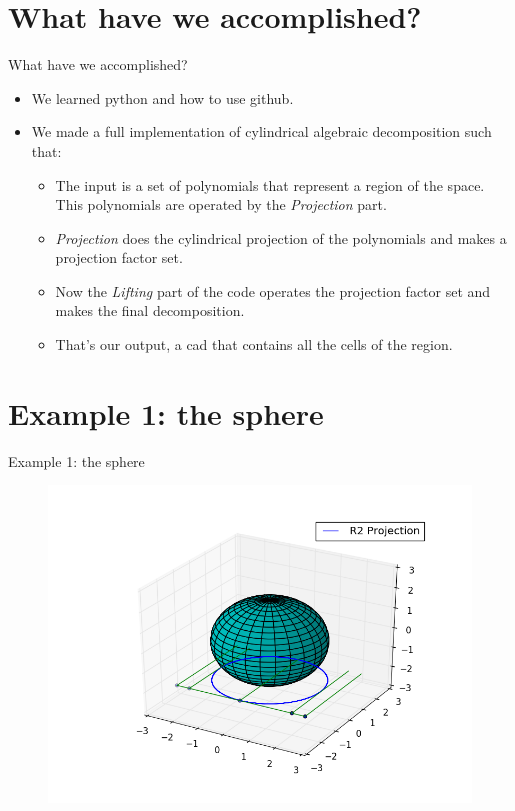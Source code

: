 \documentclass{beamer}
\begin{document}
\section{What have we accomplished?}
\begin{frame}{What have we accomplished?}
    \begin{itemize}
    	\item We learned python and how to use github.
        \item We made a full implementation of cylindrical algebraic decomposition such that: 
        \begin{itemize}
        \item The input is a set of polynomials that represent a region of the space. This polynomials are operated by the \textit{Projection} part.
        \item \textit{Projection} does the cylindrical projection of the polynomials and makes a projection factor set.
        \item Now the \textit{Lifting} part of the code operates the projection factor set and makes the final decomposition.
        \item That's our output, a cad that contains all the cells of the region.
        \end{itemize}
    \end{itemize}
\end{frame}


\section{Example 1: the sphere}
\begin{frame}{Example 1: the sphere}
\begin{figure}
\includegraphics[width=1\textwidth]{sphereR3.png}
\end{figure}
\end{frame}
\end{document}
